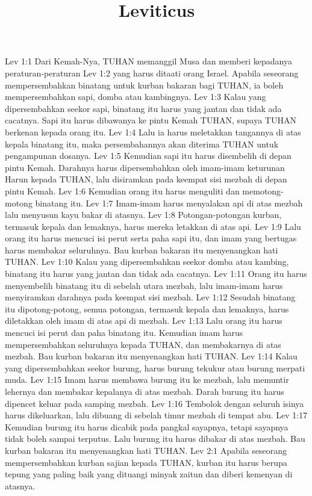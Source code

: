 

\title{Leviticus}

Lev 1:1  Dari Kemah-Nya, TUHAN memanggil Musa dan memberi kepadanya peraturan-peraturan
Lev 1:2  yang harus ditaati orang Israel. Apabila seseorang mempersembahkan binatang untuk kurban bakaran bagi TUHAN, ia boleh mempersembahkan sapi, domba atau kambingnya.
Lev 1:3  Kalau yang dipersembahkan seekor sapi, binatang itu harus yang jantan dan tidak ada cacatnya. Sapi itu harus dibawanya ke pintu Kemah TUHAN, supaya TUHAN berkenan kepada orang itu.
Lev 1:4  Lalu ia harus meletakkan tangannya di atas kepala binatang itu, maka persembahannya akan diterima TUHAN untuk pengampunan dosanya.
Lev 1:5  Kemudian sapi itu harus disembelih di depan pintu Kemah. Darahnya harus dipersembahkan oleh imam-imam keturunan Harun kepada TUHAN, lalu disiramkan pada keempat sisi mezbah di depan pintu Kemah.
Lev 1:6  Kemudian orang itu harus menguliti dan memotong-motong binatang itu.
Lev 1:7  Imam-imam harus menyalakan api di atas mezbah lalu menyusun kayu bakar di atasnya.
Lev 1:8  Potongan-potongan kurban, termasuk kepala dan lemaknya, harus mereka letakkan di atas api.
Lev 1:9  Lalu orang itu harus mencuci isi perut serta paha sapi itu, dan imam yang bertugas harus membakar seluruhnya. Bau kurban bakaran itu menyenangkan hati TUHAN.
Lev 1:10  Kalau yang dipersembahkan seekor domba atau kambing, binatang itu harus yang jantan dan tidak ada cacatnya.
Lev 1:11  Orang itu harus menyembelih binatang itu di sebelah utara mezbah, lalu imam-imam harus menyiramkan darahnya pada keempat sisi mezbah.
Lev 1:12  Sesudah binatang itu dipotong-potong, semua potongan, termasuk kepala dan lemaknya, harus diletakkan oleh imam di atas api di mezbah.
Lev 1:13  Lalu orang itu harus mencuci isi perut dan paha binatang itu. Kemudian imam harus mempersembahkan seluruhnya kepada TUHAN, dan membakarnya di atas mezbah. Bau kurban bakaran itu menyenangkan hati TUHAN.
Lev 1:14  Kalau yang dipersembahkan seekor burung, harus burung tekukur atau burung merpati muda.
Lev 1:15  Imam harus membawa burung itu ke mezbah, lalu memuntir lehernya dan membakar kepalanya di atas mezbah. Darah burung itu harus dipencet keluar pada samping mezbah.
Lev 1:16  Tembolok dengan seluruh isinya harus dikeluarkan, lalu dibuang di sebelah timur mezbah di tempat abu.
Lev 1:17  Kemudian burung itu harus dicabik pada pangkal sayapnya, tetapi sayapnya tidak boleh sampai terputus. Lalu burung itu harus dibakar di atas mezbah. Bau kurban bakaran itu menyenangkan hati TUHAN.
Lev 2:1  Apabila seseorang mempersembahkan kurban sajian kepada TUHAN, kurban itu harus berupa tepung yang paling baik yang dituangi minyak zaitun dan diberi kemenyan di atasnya.
